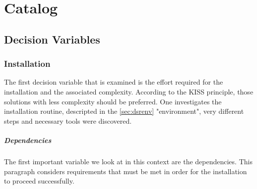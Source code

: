 \documentclass[MSC,Master,english]{twbook}%
\begin{document}
\chapter{Catalog}
\label{chap:catalog}

\section{Decision Variables}
\label{sec:variables}
\subsection{Installation}
The first decision variable that is examined is the effort required for the installation and the associated complexity. According to the KISS principle\cite{kiss}, those solutions with less complexity should be preferred. One investigates the installation routine, descripted in the  \autoref{sec:dsrenv} "environment", very different steps and necessary tools were discovered. 
\paragraph{Dependencies} The first important variable we look at in this context are the dependencies. This paragraph considers requirements that must be met in order for the installation to proceed successfully.
\end{document}
